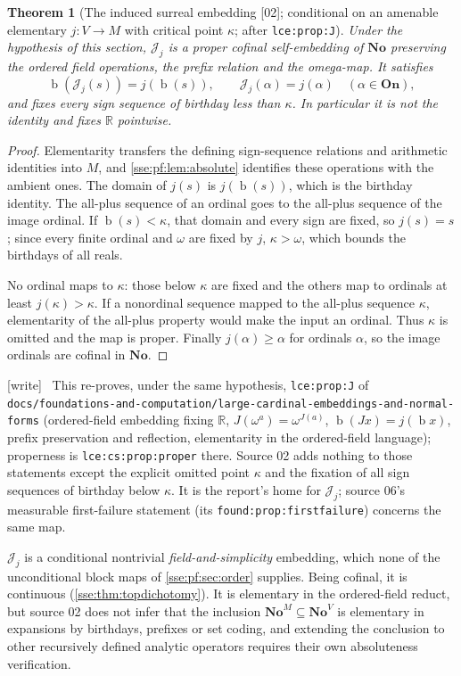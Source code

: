 \documentclass[11pt,a4paper]{article}
\numberwithin{equation}{section}
\theoremstyle{plain}
\newtheorem{theorem}{Theorem}[section]
\theoremstyle{definition}
\theoremstyle{remark}
\newcommand{\No}{\mathbf{No}}
\newcommand{\On}{\mathbf{On}}
\newcommand{\R}{\mathbb{R}}
\newcommand{\bday}{\operatorname{b}}
\newcommand{\code}[1]{\texttt{\small #1}}
\newcommand{\lbl}[1]{\nolinkurl{#1}}%
\newcommand{\fn}[1]{\nolinkurl{#1}}%
\newcommand{\src}[1]{\textup{\textsf{\small[#1]}}}%
\newcommand{\wtag}{\textup{\textsf{[write]}}}%
\newenvironment{wnote}{\par\smallskip\noindent\wtag\ }{\par\smallskip}
\begin{document}
\begin{theorem}[The induced surreal embedding \src{02}; conditional on an amenable elementary $j:V\to M$ with critical point $\kappa$; after \lbl{lce:prop:J}]\label{sse:pf:thm:large}
Under the hypothesis of this section, $\mathcal J_j$ is a proper cofinal
self-embedding of $\No$ preserving the ordered field operations, the prefix
relation and the omega-map. It satisfies
\[
 \bday(\mathcal J_j(s))=j(\bday(s)),\qquad
 \mathcal J_j(\alpha)=j(\alpha)\quad(\alpha\in\On),
\]
and fixes every sign sequence of birthday less than $\kappa$. In particular
it is not the identity and fixes $\R$ pointwise.
\end{theorem}
\begin{proof}
Elementarity transfers the defining sign-sequence relations and arithmetic
identities into $M$, and \cref{sse:pf:lem:absolute} identifies these
operations with the ambient ones. The domain of $j(s)$ is $j(\bday(s))$,
which is the birthday identity. The all-plus sequence of an ordinal goes to
the all-plus sequence of the image ordinal. If $\bday(s)<\kappa$, that
domain and every sign are fixed, so $j(s)=s$; since every finite ordinal
and $\omega$ are fixed by $j$, $\kappa>\omega$, which bounds the birthdays
of all reals.

No ordinal maps to $\kappa$: those below $\kappa$ are fixed and the others
map to ordinals at least $j(\kappa)>\kappa$. If a nonordinal sequence
mapped to the all-plus sequence $\kappa$, elementarity of the all-plus
property would make the input an ordinal. Thus $\kappa$ is omitted and the
map is proper. Finally $j(\alpha)\ge\alpha$ for ordinals $\alpha$, so the
image ordinals are cofinal in $\No$.
\end{proof}
\begin{wnote}
This re-proves, under the same hypothesis, \lbl{lce:prop:J} of
\fn{docs/foundations-and-computation/large-cardinal-embeddings-and-normal-forms}
(ordered-field embedding fixing $\R$, $J(\omega^a)=\omega^{J(a)}$,
$\bday(Jx)=j(\bday x)$, prefix preservation and reflection, elementarity in
the ordered-field language); properness is \lbl{lce:cs:prop:proper} there.
Source 02 adds nothing to those statements except the explicit omitted
point $\kappa$ and the fixation of all sign sequences of birthday below
$\kappa$. It is the report's home for $\mathcal J_j$; source 06's
measurable first-failure statement (its \code{found:prop:firstfailure})
concerns the same map.
\end{wnote}
$\mathcal J_j$ is a conditional nontrivial \emph{field-and-simplicity}
embedding, which none of the unconditional block maps of
\cref{sse:pf:sec:order} supplies. Being cofinal, it is continuous
(\cref{sse:thm:topdichotomy}). It is elementary in the ordered-field
reduct, but source 02 does not infer that the inclusion
$\No^M\subseteq\No^V$ is elementary in expansions by birthdays, prefixes or
set coding, and extending the conclusion to other recursively defined
analytic operators requires their own absoluteness verification.
\end{document}
